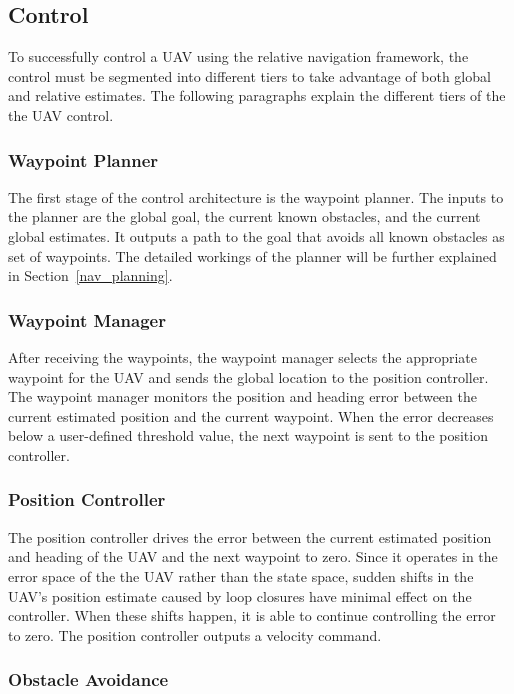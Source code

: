\documentclass[letterpaper, 10 pt, conference]{ieeeconf}  %
\begin{document}
\subsection{Control}

To successfully control a UAV using the relative navigation framework, the control must be segmented into different tiers to take advantage of both global and relative estimates. The following paragraphs explain the different tiers of the the UAV control.

\subsubsection{Waypoint Planner}

The first stage of the control architecture is the waypoint planner. The inputs to the planner are the global goal, the current known obstacles, and the current global estimates. It outputs a path to the goal that avoids all known obstacles as set of waypoints. The detailed workings of the planner will be further explained in Section~\ref{nav_planning}.

\subsubsection{Waypoint Manager}

After receiving the waypoints, the waypoint manager selects the appropriate waypoint for the UAV and sends the global location to the position controller. The waypoint manager monitors the position and heading error between the current estimated position and the current waypoint. When the error decreases below a user-defined threshold value, the next waypoint is sent to the position controller.

\subsubsection{Position Controller}

The position controller drives the error between the current estimated position and heading of the UAV and the next waypoint to zero. Since it operates in the error space of the the UAV rather than the state space, sudden shifts in the UAV's position estimate caused by loop closures have minimal effect on the controller. When these shifts happen, it is able to continue controlling the error to zero. The position controller outputs a velocity command.

\subsubsection{Obstacle Avoidance} \label{obs_avoid}
\end{document}
